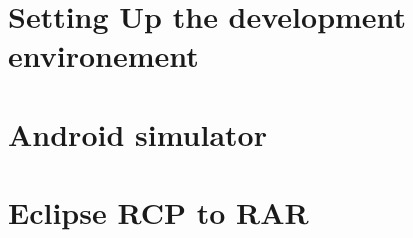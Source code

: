 \documentclass[12pt]{report}
\begin{document}
    \chapter{Setting Up the development environement}
      
      
      
    \chapter{Android simulator}

    \chapter{Eclipse RCP to RAR}
      
  \pagebreak
  \nocite{*}
  
  

  \pagebreak
  \printindex
\end{document}
